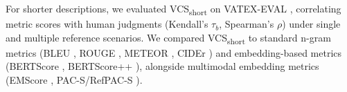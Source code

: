 For shorter descriptions, we evaluated VCS\textsubscript{short} on VATEX-EVAL \cite{shi2022emscore}, correlating metric scores with human judgments (Kendall's $\tau_b$, Spearman's $\rho$) under single and multiple reference scenarios. We compared VCS\textsubscript{short} to standard n-gram metrics (BLEU \cite{papineni2002bleu}, ROUGE \cite{lin2004rouge}, METEOR \cite{banerjee2005meteor}, CIDEr \cite{vedantam2015cider}) and embedding-based metrics (BERTScore \cite{zhang2019bertscore}, BERTScore++ \cite{yi2020improving}), alongside multimodal embedding metrics (EMScore \cite{shi2022emscore}, PAC-S/RefPAC-S \cite{sarto2023positive}).